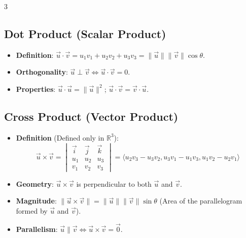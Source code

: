 \documentclass[10pt,landscape,a4paper]{article}
\begin{document}
\begin{multicols*}{3}
\subsection{Dot Product (Scalar Product)}
\begin{itemize}
    \item \textbf{Definition}: $\vec{u} \cdot \vec{v} = u_1v_1 + u_2v_2 + u_3v_3 = \|\vec{u}\|\|\vec{v}\|\cos\theta$.
    \item \textbf{Orthogonality}: $\vec{u} \perp \vec{v} \iff \vec{u} \cdot \vec{v} = 0$.
    \item \textbf{Properties}: $\vec{u} \cdot \vec{u} = \|\vec{u}\|^2$; $\vec{u} \cdot \vec{v} = \vec{v} \cdot \vec{u}$.
\end{itemize}

\subsection{Cross Product (Vector Product)}
\begin{itemize}
    \item \textbf{Definition} (Defined only in $\mathbb{R}^3$):
    \[ \vec{u} \times \vec{v} = \begin{vmatrix} \vec{i} & \vec{j} & \vec{k} \\ u_1 & u_2 & u_3 \\ v_1 & v_2 & v_3 \end{vmatrix} = \langle u_2v_3 - u_3v_2, u_3v_1 - u_1v_3, u_1v_2 - u_2v_1 \rangle \]
    \item \textbf{Geometry}: $\vec{u} \times \vec{v}$ is perpendicular to both $\vec{u}$ and $\vec{v}$.
    \item \textbf{Magnitude}: $\|\vec{u} \times \vec{v}\| = \|\vec{u}\|\|\vec{v}\|\sin\theta$ (Area of the parallelogram formed by $\vec{u}$ and $\vec{v}$).
    \item \textbf{Parallelism}: $\vec{u} \parallel \vec{v} \iff \vec{u} \times \vec{v} = \vec{0}$.
\end{itemize}


\end{multicols*}
\end{document}
